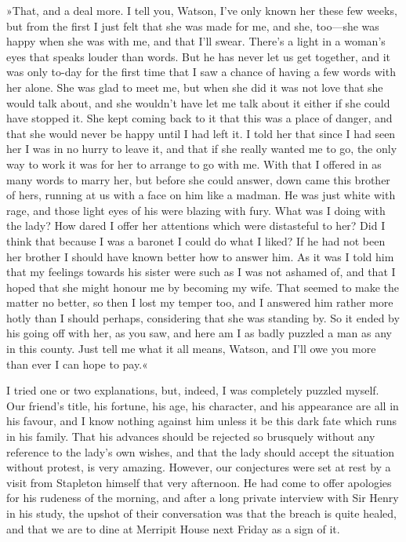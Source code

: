 »That, and a deal more. I tell you, Watson, I've only known her these few weeks, but from the first I just felt that she was made for me, and she, too\allowbreak---\allowbreak she was happy when she was with me, and that I'll swear. There's a light in a woman's eyes that speaks louder than words. But he has never let us get together, and it was only to-day for the first time that I saw a chance of having a few words with her alone. She was glad to meet me, but when she did it was not love that she would talk about, and she wouldn't have let me talk about it either if she could have stopped it. She kept coming back to it that this was a place of danger, and that she would never be happy until I had left it. I told her that since I had seen her I was in no hurry to leave it, and that if she really wanted me to go, the only way to work it was for her to arrange to go with me. With that I offered in as many words to marry her, but before she could answer, down came this brother of hers, running at us with a face on him like a madman. He was just white with rage, and those light eyes of his were blazing with fury. What was I doing with the lady? How dared I offer her attentions which were distasteful to her? Did I think that because I was a baronet I could do what I liked? If he had not been her brother I should have known better how to answer him. As it was I told him that my feelings towards his sister were such as I was not ashamed of, and that I hoped that she might honour me by becoming my wife. That seemed to make the matter no better, so then I lost my temper too, and I answered him rather more hotly than I should perhaps, considering that she was standing by. So it ended by his going off with her, as you saw, and here am I as badly puzzled a man as any in this county. Just tell me what it all means, Watson, and I'll owe you more than ever I can hope to pay.«

I tried one or two explanations, but, indeed, I was completely puzzled myself. Our friend's title, his fortune, his age, his character, and his appearance are all in his favour, and I know nothing against him unless it be this dark fate which runs in his family. That his advances should be rejected so brusquely without any reference to the lady's own wishes, and that the lady should accept the situation without protest, is very amazing. However, our conjectures were set at rest by a visit from Stapleton himself that very afternoon. He had come to offer apologies for his rudeness of the morning, and after a long private interview with Sir Henry in his study, the upshot of their conversation was that the breach is quite healed, and that we are to dine at Merripit House next Friday as a sign of it.

